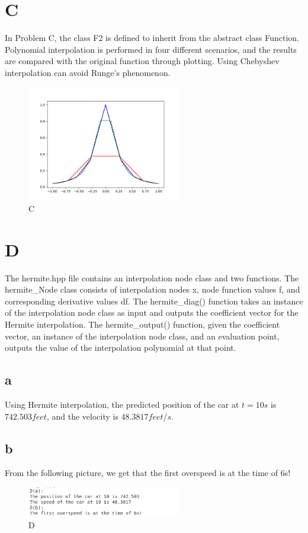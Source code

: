 \documentclass[a4paper]{article}
\begin{document}
\section{C}
In Problem C, the class F2 is defined to inherit from the abstract class Function. Polynomial interpolation is performed in four different scenarios, 
and the results are compared with the original function through plotting. Using Chebyshev interpolation can avoid Runge's phenomenon.
\begin{figure}[htbp]
  \centering
  \includegraphics[width=0.6\textwidth]{C.png}
  \caption{C}
  \label{C}
\end{figure}

\section{D}
The hermite.hpp file contains an interpolation node class and two functions. The hermite{\_}Node class consists of interpolation nodes x, node function values f,
 and corresponding derivative values df. The hermite{\_}diag() function takes an instance of the interpolation node class as input and outputs the coefficient
vector for the Hermite interpolation. The hermite{\_}output() function, given the coefficient vector, an instance of the interpolation node class, and an evaluation point, outputs the value of the interpolation polynomial at that point.

\subsection*{a}
Using Hermite interpolation, the predicted position of the car at $t=10s$ is $742.503 feet$, and the velocity is $48.3817 feet/s$.
\subsection*{b}
From the following picture, we get that the first overspeed is at the time of 6s!
\begin{figure}[htbp]
  \centering
  \includegraphics[width=0.6\textwidth]{D.png}
  \caption{D}
  \label{D}
\end{figure}
\end{document}
